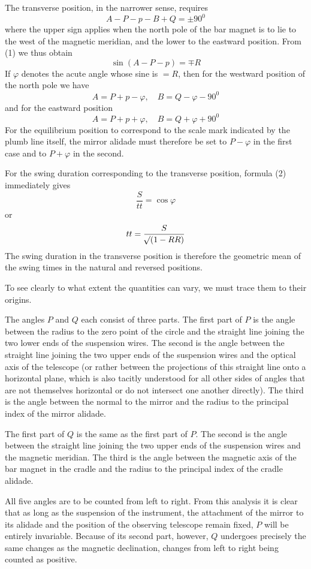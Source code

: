 The transverse position, in the narrower sense, requires
\[
A-P-p-B+Q=\pm90^0
\]
where the upper sign applies when the north pole of the bar magnet is to lie to the west of the magnetic meridian, and the lower to the eastward position. From (1) we thus obtain
\[
\sin(A-P-p)=\mp R
\]
If $\varphi$ denotes the acute angle whose sine is $=R$, then for the westward position of the north pole we have
\[
A=P+p-\varphi,\quad B=Q-\varphi-90^0
\]
and for the eastward position
\[
A=P+p+\varphi,\quad B=Q+\varphi+90^0
\]
For the equilibrium position to correspond to the scale mark indicated by the plumb line itself, the mirror alidade must therefore be set to $P-\varphi$ in the first case and to $P+\varphi$ in the second.

For the swing duration corresponding to the transverse position, formula (2) immediately gives
\[
\frac{S}{tt}=\cos\varphi
\]
or
\[
tt=\frac{S}{\mathord{{}^{}\!\surd}(1-RR)}
\]
The swing duration in the transverse position is therefore the geometric mean of the swing times in the natural and reversed positions.

To see clearly to what extent the quantities can vary, we must trace them to their origins.

The angles $P$ and $Q$ each consist of three parts. The first part of $P$ is the angle between the radius to the zero point of the circle and the straight line joining the two lower ends of the suspension wires. The second is the angle between the straight line joining the two upper ends of the suspension wires and the optical axis of the telescope (or rather between the projections of this straight line onto a horizontal plane, which is also tacitly understood for all other sides of angles that are not themselves horizontal or do not intersect one another directly). The third is the angle between the normal to the mirror and the radius to the principal index of the mirror alidade.

The first part of $Q$ is the same as the first part of $P$. The second is the angle between the straight line joining the two upper ends of the suspension wires and the magnetic meridian. The third is the angle between the magnetic axis of the bar magnet in the cradle and the radius to the principal index of the cradle alidade.

All five angles are to be counted from left to right. From this analysis it is clear that as long as the suspension of the instrument, the attachment of the mirror to its alidade and the position of the observing telescope remain fixed, $P$ will be entirely invariable. Because of its second part, however, $Q$ undergoes precisely the same changes as the magnetic declination, changes from left to right being counted as positive.

